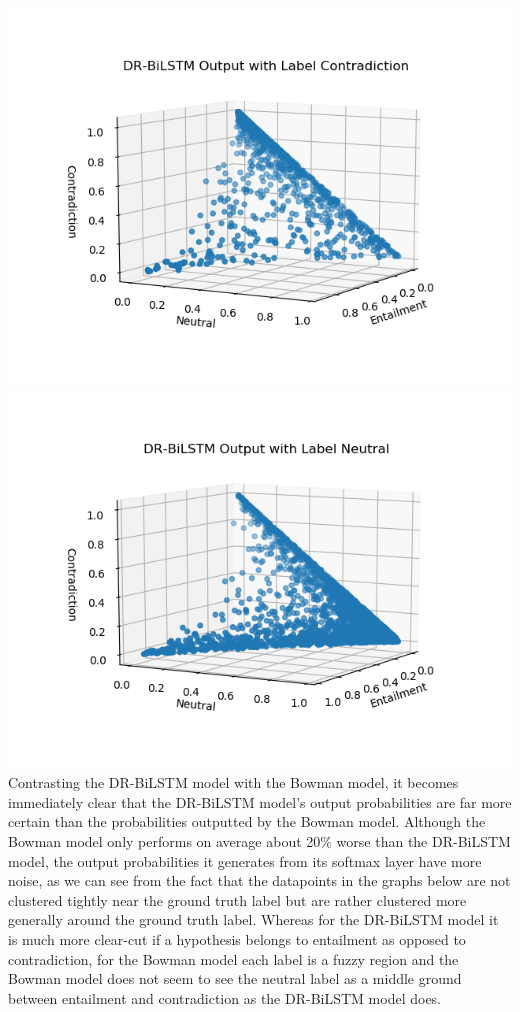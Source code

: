 \documentclass[12pt,letterpaper]{article}
\begin{document}
\includegraphics[scale=0.55]{lstmContradiction.png}\\
\includegraphics[scale=0.52]{lstmNeutral.png}\\
Contrasting the DR-BiLSTM model with the Bowman model, it becomes immediately clear that the DR-BiLSTM model's output probabilities are far more certain than the probabilities outputted by the Bowman model. Although the Bowman model only performs on average about 20$\%$ worse than the DR-BiLSTM model, the output probabilities it generates from its softmax layer have more noise, as we can see from the fact that the datapoints in the graphs below are not clustered tightly near the ground truth label but are rather clustered more generally around the ground truth label. Whereas for the DR-BiLSTM model it is much more clear-cut if a hypothesis belongs to entailment as opposed to contradiction, for the Bowman model each label is a fuzzy region and the Bowman model does not seem to see the neutral label as a middle ground between entailment and contradiction as the DR-BiLSTM model does.\\
\end{document}
